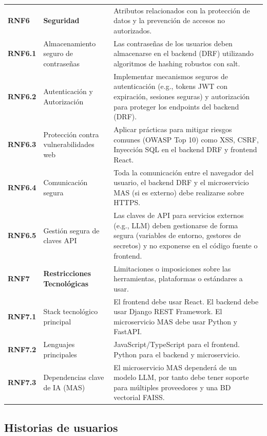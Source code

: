 \begin{longtable}{@{}l >{\raggedright\arraybackslash}p{5cm} >{\raggedright\arraybackslash}p{8cm}@{}}
	\textbf{RNF6} & \textbf{Seguridad} & Atributos relacionados con la protección de datos y la prevención de accesos no autorizados. \\
	\textbf{RNF6.1} & Almacenamiento seguro de contraseñas & Las contraseñas de los usuarios deben almacenarse en el backend (DRF) utilizando algoritmos de hashing robustos con salt. \\
	\textbf{RNF6.2} & Autenticación y Autorización & Implementar mecanismos seguros de autenticación (e.g., tokens JWT con expiración, sesiones seguras) y autorización para proteger los endpoints del backend (DRF). \\
	\textbf{RNF6.3} & Protección contra vulnerabilidades web & Aplicar prácticas para mitigar riesgos comunes (OWASP Top 10) como XSS, CSRF, Inyección SQL en el backend DRF y frontend React. \\
	\textbf{RNF6.4} & Comunicación segura & Toda la comunicación entre el navegador del usuario, el backend DRF y el microservicio MAS (si es externo) debe realizarse sobre HTTPS. \\
	\textbf{RNF6.5} & Gestión segura de claves API & Las claves de API para servicios externos (e.g., LLM) deben gestionarse de forma segura (variables de entorno, gestores de secretos) y no exponerse en el código fuente o frontend. \\
	\midrule
	
	\textbf{RNF7} & \textbf{Restricciones Tecnológicas} & Limitaciones o imposiciones sobre las herramientas, plataformas o estándares a usar. \\ %
	\textbf{RNF7.1} & Stack tecnológico principal & El frontend debe usar React. El backend debe usar Django REST Framework. El microservicio MAS debe usar Python y FastAPI. \\ %
	\textbf{RNF7.2} & Lenguajes principales & JavaScript/TypeScript para el frontend. Python para el backend y microservicio. \\ %
	\textbf{RNF7.3} & Dependencias clave de IA (MAS) & El microservicio MAS dependerá de un modelo LLM, por tanto debe tener soporte para múltiples proveedores y una BD vectorial FAISS. \\ %
	
\end{longtable}


\subsection{Historias de usuarios}

